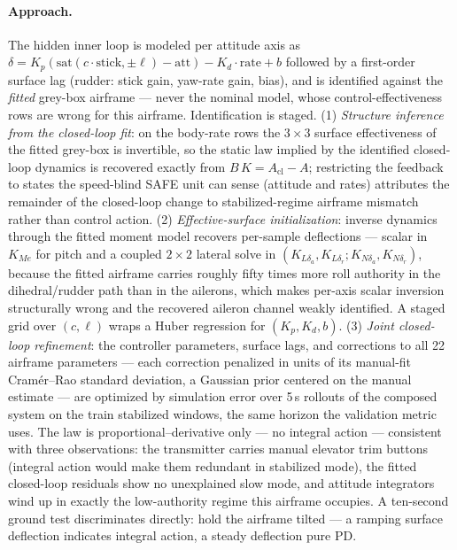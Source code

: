 \documentclass[11pt]{article}
\begin{document}
\paragraph{Approach.} The hidden inner loop is modeled per attitude axis as
$\delta=K_p(\mathrm{sat}(c\cdot\mathrm{stick},
\pm\ell)-\mathrm{att})-K_d\cdot\mathrm{rate}+b$ followed by a
first-order surface lag (rudder: stick gain, yaw-rate gain, bias), and is
identified against the \emph{fitted} grey-box airframe --- never the nominal
model, whose control-effectiveness rows are wrong for this airframe.
Identification is staged. (1) \emph{Structure inference from the
closed-loop fit}: on the body-rate rows the $3\times3$ surface
effectiveness of the fitted grey-box is invertible, so the static law
implied by the identified closed-loop dynamics is recovered exactly from
$B\,K = A_{\mathrm{cl}}-A$; restricting the feedback to states the
speed-blind SAFE unit can sense (attitude and rates) attributes the
remainder of the closed-loop change to stabilized-regime airframe mismatch
rather than control action. (2) \emph{Effective-surface initialization}:
inverse dynamics through the fitted moment model recovers per-sample
deflections --- scalar in $K_{Me}$ for pitch and a coupled $2\times2$
lateral solve in $(K_{L\delta_a},K_{L\delta_r};K_{N\delta_a},K_{N\delta_r})$,
because the fitted airframe carries roughly fifty times more roll authority
in the dihedral/rudder path than in the ailerons, which makes per-axis
scalar inversion structurally wrong and the recovered aileron channel
weakly identified. A staged grid over $(c,\ell)$ wraps a Huber regression
for $(K_p,K_d,b)$. (3) \emph{Joint closed-loop refinement}: the controller
parameters, surface lags, and corrections to all 22 airframe parameters ---
each correction penalized in units of its manual-fit Cram\'er--Rao standard
deviation, a Gaussian prior centered on the manual estimate --- are
optimized by simulation error over 5\,s rollouts of the composed system on
the train stabilized windows, the same horizon the validation metric uses.
The law is proportional--derivative only --- no integral action ---
consistent with three observations: the transmitter carries manual elevator
trim buttons (integral action would make them redundant in stabilized
mode), the fitted closed-loop residuals show no unexplained slow mode, and
attitude integrators wind up in exactly the low-authority regime this
airframe occupies. A ten-second ground test discriminates directly: hold
the airframe tilted --- a ramping surface deflection indicates integral
action, a steady deflection pure PD.
\end{document}
